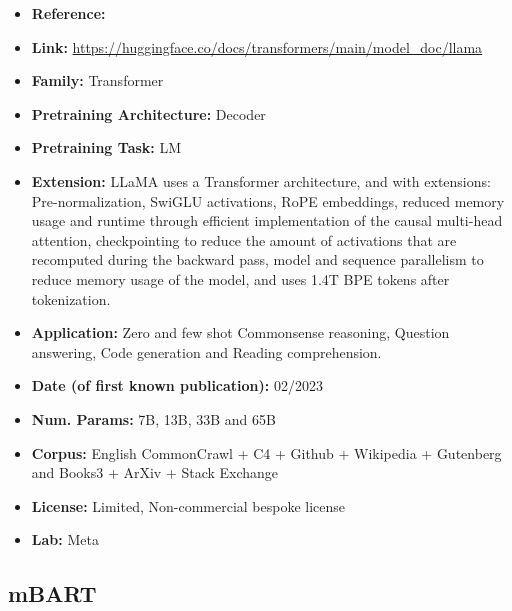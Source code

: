 \documentclass{article}
\begin{document}
            \begin{itemize}
                \item \textbf{Reference:} 
                \item \textbf{Link:} \url{https://huggingface.co/docs/transformers/main/model_doc/llama}
                \item \textbf{Family:} Transformer
                \item \textbf{Pretraining Architecture:} Decoder
                \item \textbf{Pretraining Task:} LM
                \item \textbf{Extension:} LLaMA uses a Transformer architecture, and with extensions: Pre-normalization, SwiGLU activations, RoPE embeddings,  reduced memory usage and runtime through efficient implementation of the causal multi-head attention, checkpointing to reduce the amount of activations that are recomputed during the backward pass, model and sequence parallelism to reduce memory usage of the model, and uses 1.4T BPE tokens after tokenization.
                \item \textbf{Application:} Zero and few shot Commonsense reasoning, Question answering, Code generation and Reading comprehension.
                \item \textbf{Date (of first known publication):} 02/2023
                \item \textbf{Num. Params:} 7B, 13B, 33B and 65B
                \item \textbf{Corpus:} English CommonCrawl + C4 + Github + Wikipedia + Gutenberg and Books3 + ArXiv + Stack Exchange 
                \item \textbf{License:} Limited, Non-commercial bespoke license
                \item \textbf{Lab:} Meta
            \end{itemize}
            
\subsection{mBART}
\end{document}

